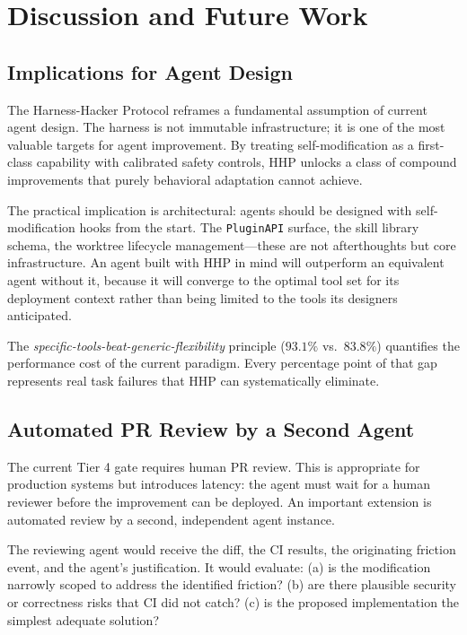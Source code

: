 \section{Discussion and Future Work}

\label{sec:discussion}

\subsection{Implications for Agent Design}
\label{sec:implications}

The Harness-Hacker Protocol reframes a fundamental assumption of current agent
design. The harness is not immutable infrastructure; it is one of the most
valuable targets for agent improvement. By treating self-modification as a
first-class capability with calibrated safety controls, HHP unlocks a class of
compound improvements that purely behavioral adaptation cannot achieve.

The practical implication is architectural: agents should be designed with
self-modification hooks from the start. The \texttt{PluginAPI} surface, the
skill library schema, the worktree lifecycle management---these are not
afterthoughts but core infrastructure. An agent built with HHP in mind will
outperform an equivalent agent without it, because it will converge to the
optimal tool set for its deployment context rather than being limited to the
tools its designers anticipated.

The \emph{specific-tools-beat-generic-flexibility} principle ($93.1\%$ vs.\
$83.8\%$) quantifies the performance cost of the current paradigm. Every
percentage point of that gap represents real task failures that HHP can
systematically eliminate.

\subsection{Automated PR Review by a Second Agent}
\label{sec:auto-review}

The current Tier 4 gate requires human PR review. This is appropriate for
production systems but introduces latency: the agent must wait for a human
reviewer before the improvement can be deployed. An important extension is
automated review by a second, independent agent instance.

The reviewing agent would receive the diff, the CI results, the originating
friction event, and the agent's justification. It would evaluate: (a) is the
modification narrowly scoped to address the identified friction? (b) are there
plausible security or correctness risks that CI did not catch? (c) is the
proposed implementation the simplest adequate solution?

